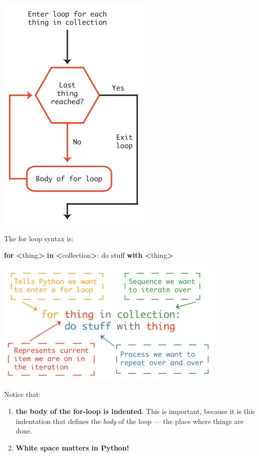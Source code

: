 \documentclass[
]{book}
\newenvironment{Shaded}{\begin{snugshade}}{\end{snugshade}}
\newcommand{\ControlFlowTok}[1]{\textcolor[rgb]{0.13,0.29,0.53}{\textbf{#1}}}
\newcommand{\KeywordTok}[1]{\textcolor[rgb]{0.13,0.29,0.53}{\textbf{#1}}}
\newcommand{\NormalTok}[1]{#1}
\newcommand{\OperatorTok}[1]{\textcolor[rgb]{0.81,0.36,0.00}{\textbf{#1}}}
\providecommand{\tightlist}{%
  \setlength{\itemsep}{0pt}\setlength{\parskip}{0pt}}
\begin{document}
\includegraphics{Python/PythonIntro/images/for_loop_pic_small.png}

The for loop syntax is:

\begin{Shaded}
\begin{Highlighting}[]
\ControlFlowTok{for} \OperatorTok{\textless{}}\NormalTok{thing}\OperatorTok{\textgreater{}} \KeywordTok{in} \OperatorTok{\textless{}}\NormalTok{collection}\OperatorTok{\textgreater{}}\NormalTok{:}
\NormalTok{    do stuff }\ControlFlowTok{with} \OperatorTok{\textless{}}\NormalTok{thing}\OperatorTok{\textgreater{}}
\end{Highlighting}
\end{Shaded}

\includegraphics{Python/PythonIntro/images/python_for_loop_small.png}

Notice that:

\begin{enumerate}
\def\labelenumi{\arabic{enumi}.}
\tightlist
\item
  \textbf{the body of the for-loop is indented}. This is important, because it is this indentation that defines the \emph{body} of the loop --- the place where things are done.
\item
  \textbf{White space matters in Python!}
\end{enumerate}
\end{document}
